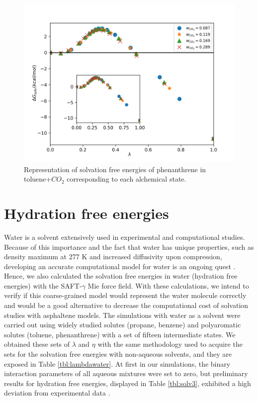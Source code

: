 \documentclass[
	12pt,				%
	openany,			%
	oneside,			%
	a4paper,			%
	english,			%
	brazil				%
	]{abntex2}
\begin{document}
\begin{figure}[H]
	\centering
	\includegraphics[width=0.8\linewidth]{Figures/tolco2}
	\caption{Representation of solvation free energies of phenanthrene in toluene+$CO_{2}$ corresponding to each alchemical state.}
	\label{fig:Figure_1}
\end{figure}


\section{Hydration free energies}

Water is a solvent extensively used in experimental and computational studies. Because of this importance and the fact that water has unique properties, such as density maximum at 277 K and increased diffusivity upon compression, developing an accurate computational model for water is an ongoing quest \cite{hadley2012}. Hence, we also calculated the solvation free energies in water (hydration free energies) with the SAFT-$\gamma$ Mie force field. With these calculations, we intend to verify if this coarse-grained model would represent the water molecule correctly and would be a good alternative to decrease the computational cost of solvation studies with asphaltene models. The simulations with water as a solvent were carried out using widely studied solutes (propane, benzene) and polyaromatic solutes (toluene, phenanthrene) with a set of fifteen intermediate states.  We obtained these sets of $\lambda$ and $\eta$ with the same methodology used to acquire the sets for the solvation free energies with non-aqueous solvents, and they are exposed in Table \ref{tbl:lambdawater}. At first in our simulations, the binary interaction parameters of all aqueous mixtures were set to zero, but preliminary results for hydration free energies, displayed in Table \ref{tbl:solv3},  exhibited a high deviation from experimental data \cite{P29900000291, doi:10.1021/ct050097l}.
\end{document}
